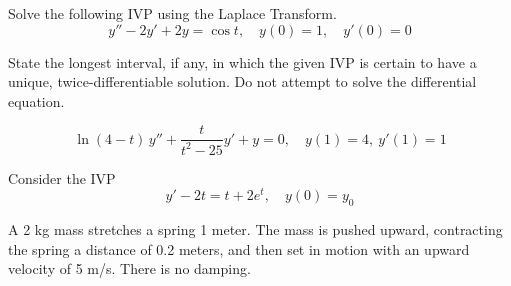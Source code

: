 \documentclass[11pt]{exam}
\begin{document}
\begin{questions}
    \question[5] Solve the following IVP using the Laplace Transform. 
        $$y'' - 2y'  + 2y =\cos t, \quad y(0)=1,\quad y'(0)=0$$  %
  
    
    
    
\newpage \InitialsLeft
    \question[2] State the longest interval, if any, in which the given IVP is certain to have a unique, twice-differentiable solution. Do not attempt to solve the differential equation. 
    
    $$\ln (4 - t) \, y''+\frac{t}{t^2-25}y'+y=0, \quad y(1)=4,\ y'(1)=1$$ %
    
    \vspace{2cm} 

    \question[8] 
    Consider the IVP 
    $$y' - 2 t = t + 2e^t, \quad y(0) = y_0$$ %
            

    

    
    
\newpage \InitialsRight

    \question[10] A 2 kg mass stretches a spring 1 meter. The mass is pushed upward, contracting the spring a distance of 0.2 meters, and then set in motion with an upward velocity of 5 m/s. There is no damping. 
    

\end{questions}
\end{document}
